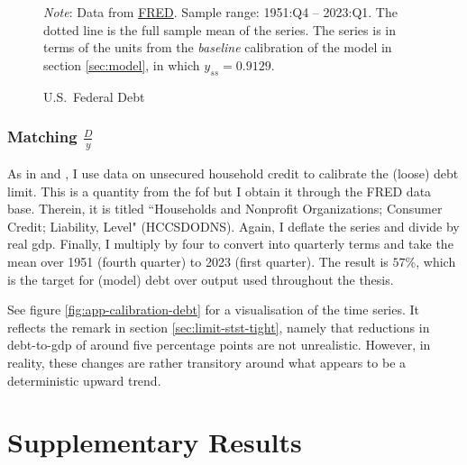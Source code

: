 \documentclass[a4paper,12pt]{article} %
\numberwithin{equation}{section} %
\numberwithin{figure}{section}
\numberwithin{table}{section}
\begin{document}
\begin{refsection}
\begin{appendices}
\begin{figure}[H]
    \centering
    \caption{U.S.~Federal Debt}
    \label{fig:app-calibration-bonds}
    

    \vspace{10pt}
    
    \begin{minipage}{0.75\textwidth} 
    \footnotesize
    \textit{Note}: Data from \href{https://fred.stlouisfed.org}{FRED}. Sample range: 1951:Q4 -- 2023:Q1. The dotted line is the full sample mean of the series. The series is in terms of the units from the \textit{baseline} calibration of the model in section \ref{sec:model}, in which $y_{ss} = 0.9129$.
    \end{minipage}
\end{figure}

\subsubsection*{Matching $\frac{D}{y}$}

As in \textcite{gl2017} and \textcite{bayer2023}, I use data on unsecured household credit to calibrate the (loose) debt limit. This is a quantity from the \Gls{fof} but I obtain it through the FRED data base. Therein, it is titled ``Households and Nonprofit Organizations; Consumer Credit; Liability, Level" (HCCSDODNS). Again, I deflate the series and divide by real \Gls{gdp}. Finally, I multiply by four to convert into quarterly terms and take the mean over 1951 (fourth quarter) to 2023 (first quarter). The result is $57\%$, which is the target for (model) debt over output used throughout the thesis. 

See figure \ref{fig:app-calibration-debt} for a visualisation of the time series. It reflects the remark in section \ref{sec:limit-stst-tight}, namely that reductions in debt-to-\Gls{gdp} of around five percentage points are not unrealistic. However, in reality, these changes are rather transitory around what appears to be a deterministic upward trend.

\section{Supplementary Results}
\label{sec-app:figures}


\end{appendices}
\end{refsection}
\end{document}
